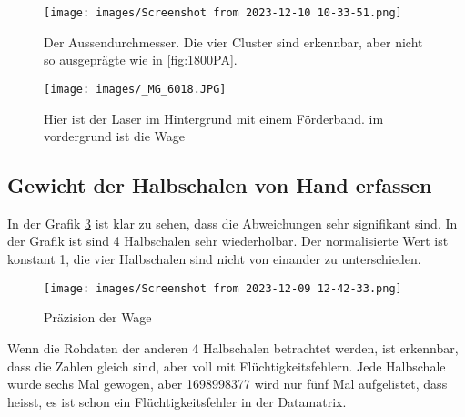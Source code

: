 \begin{figure}
   
  \texttt{[image: images/Screenshot from 2023-12-10 10-33-51.png]}
  \caption{Der Aussendurchmesser. Die vier Cluster sind erkennbar, aber nicht so ausgeprägte wie in \ref{fig:1800PA}.}
  \label{fig:1800HA}
\end{figure}


\begin{figure}%
   
  \texttt{[image: images/\_MG\_6018.JPG]}
  \caption{Hier ist der Laser im Hintergrund mit einem Förderband. im vordergrund ist die Wage}
  \label{fig:wage}
\end{figure}





\subsection{Gewicht der Halbschalen von Hand erfassen}
In der Grafik \ref{fig:WageVonHand} ist klar zu sehen, dass die Abweichungen sehr signifikant sind. In der Grafik ist sind 4 Halbschalen sehr wiederholbar. Der normalisierte Wert ist konstant 1, die vier Halbschalen sind nicht von einander zu unterschieden.


\begin{figure}
   
  \texttt{[image: images/Screenshot from 2023-12-09 12-42-33.png]}
  \caption{Präzision der Wage \cite{SchwindungLit}}
  \label{fig:WageVonHand}
\end{figure}


Wenn die Rohdaten der anderen 4 Halbschalen betrachtet werden, ist erkennbar, dass die Zahlen gleich sind, aber voll mit Flüchtigkeitsfehlern. Jede Halbschale wurde sechs Mal gewogen, aber 1698998377 wird nur fünf Mal aufgelistet, dass heisst, es ist schon ein Flüchtigkeitsfehler in der Datamatrix.


